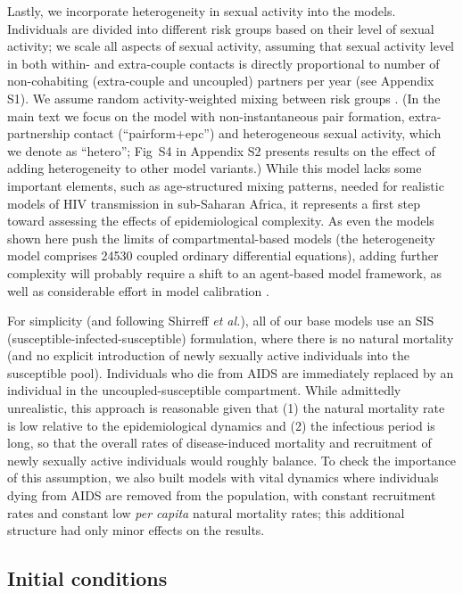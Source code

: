 \documentclass[10pt,letterpaper]{article}
\renewcommand{\figurename}{Fig}
\newcommand{\etal}{\textit{et al.}}
\begin{document}
Lastly, we incorporate heterogeneity in sexual activity into the models. Individuals are divided into different risk groups based on their level of sexual activity; we scale all aspects of sexual activity, assuming that sexual activity level in both within- and extra-couple contacts is directly proportional to number of non-cohabiting (extra-couple and uncoupled) partners per year \cite{omori2015dynamics} (see Appendix S1). We assume random activity-weighted mixing between risk groups \cite{may_transmission_1988}. 
(In the main text we focus on the model with non-instantaneous pair formation, extra-partnership contact (``pairform+epc'') and heterogeneous sexual activity, which we denote as ``hetero''; \figurename~S4 in Appendix S2 presents results on the effect of adding heterogeneity to other model variants.)
While this model lacks some 
important elements, such as age-structured mixing patterns, needed for realistic models of HIV transmission in sub-Saharan Africa, it represents a first step toward assessing the effects of epidemiological complexity. As even the models shown here push the limits of compartmental-based models (the heterogeneity model comprises 24530 coupled ordinary differential equations), adding further complexity will probably require a shift to an agent-based model framework, as well as considerable effort in model calibration \cite{herbeck_hiv_2014,delva_connecting_2016}.

For simplicity (and following
Shirreff \etal), all of our base models use an SIS (susceptible-infected-susceptible) formulation, where 
there is no natural mortality (and no explicit introduction of newly sexually active individuals into
the susceptible pool). Individuals
who die from AIDS are immediately replaced by an individual in the uncoupled-susceptible compartment.
While admittedly unrealistic, this approach is reasonable given that (1) the natural mortality rate is low relative to
the epidemiological dynamics and (2) the infectious period is long, so that the overall rates of
disease-induced mortality and recruitment of newly sexually active individuals would roughly
balance. To check the importance of this assumption,
we also built models with vital dynamics where individuals dying from AIDS
are removed from the population, with constant recruitment rates and constant low
\emph{per capita} natural mortality rates; this additional structure had only minor effects on
the results.

\subsection*{Initial conditions}
\end{document}
